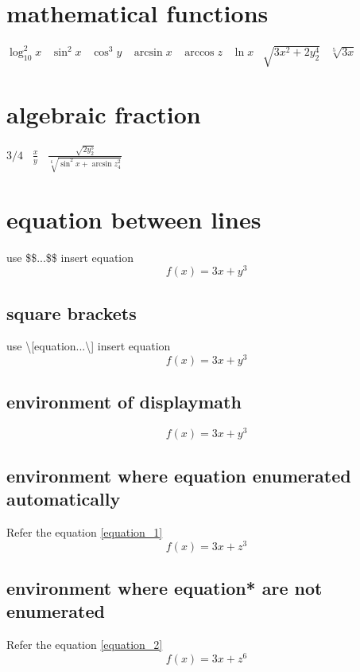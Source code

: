 \documentclass{article}
\begin{document}
    \section{mathematical functions}
    \(\log_{10}^2 x\)
    \ \(\sin^2 x\)
    \ \(\cos^3 y\)
    \ \(\arcsin x\)
    \ \(\arccos z\)
    \ \(\ln x\)
    \ \(\sqrt{3x^2+2y^4_2}\)
    \ \(\sqrt[5]{3x}\)

    \section{algebraic fraction}
    \(3/4\)
    \ \(\frac{x}{y}\)
    \ \(\frac{\sqrt{2y_2^5}}{\sqrt[6]{\sin^2 x+\arcsin z_4^2}}\)

    \section{equation between lines}

    use \$\$...\$\$ insert equation
    $$f(x)=3x+y^3$$    
    
    \subsection{square brackets}
    use \textbackslash [equation...\textbackslash ] insert equation
    \[f(x)=3x+y^3\] %
    
    \subsection{environment of displaymath}
    \begin{displaymath}
        f(x)=3x+y^3
    \end{displaymath}

    \subsection{environment where equation enumerated automatically}
    Refer the equation \ref{equation_1}
    \begin{equation}
        f(x)=3x+z^3 
        \label{equation_1}
    \end{equation}
    
    \subsection{environment where equation* are not enumerated }
    Refer the equation \ref{equation_2}
    \begin{equation*} %
        f(x)=3x+z^6
        \label{equation_2}
    \end{equation*}
\end{document}
